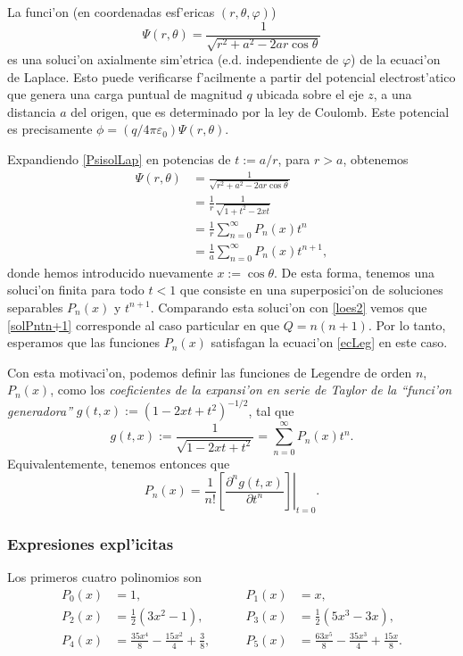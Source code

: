 La funci'on (en coordenadas esf'ericas $(r,\theta,\varphi)$)
\begin{equation}\label{PsisolLap}
\Psi(r,\theta)=\frac{1}{\sqrt{r^2+a^2-2ar\cos\theta}}
\end{equation}
es una soluci'on axialmente sim'etrica (e.d. independiente de $\varphi$) de la ecuaci'on de Laplace. Esto puede verificarse f'acilmente a partir del potencial electrost'atico que genera una carga puntual de magnitud $q$ ubicada sobre el eje $z$, a una distancia $a$ del origen, que es determinado por la ley de Coulomb. Este potencial es precisamente $\phi=(q/4\pi\varepsilon_0)\Psi(r,\theta)$.

Expandiendo \eqref{PsisolLap} en potencias de $t:=a/r$, para $r>a$, obtenemos
\begin{align}
\Psi(r,\theta) &= \frac{1}{\sqrt{r^2+a^2-2ar\cos\theta}} \\
&= \frac{1}{r}\frac{1}{\sqrt{1+t^2-2xt}} \\
&= \frac{1}{r}\sum_{n=0}^\infty P_n(x)t^n \\
&= \frac{1}{a}\sum_{n=0}^\infty P_n(x)t^{n+1}, \label{solPntn+1}
\end{align}
donde hemos introducido nuevamente $x:=\cos\theta$. De esta forma, tenemos una soluci'on finita para todo $t<1$ que consiste en una superposici'on de soluciones separables $P_n(x)$ y $t^{n+1}$. Comparando esta soluci'on con \eqref{loes2} vemos que \eqref{solPntn+1} corresponde al caso particular en que $Q=n(n+1)$. Por lo tanto, esperamos que las funciones $P_n(x)$ satisfagan la ecuaci'on \eqref{ecLeg} en este caso.  

Con esta motivaci'on, podemos definir las funciones de Legendre de orden $n$, $P_n(x)$, como los \textit{coeficientes de la expansi'on en serie de Taylor de la ``funci'on generadora''}  $g(t,x):=(1-2xt+t^2)^{-1/2}$, tal que
\begin{equation}
g(t,x):=\frac{1}{\sqrt{1-2xt+t^2}}=\sum_{n=0}^{\infty}P_{n}(x)t^{n}.
\end{equation}
Equivalentemente, tenemos entonces que
\begin{equation}
P_n(x)=\frac{1}{n!}\left.\left[\frac{\partial^ng(t,x)}{\partial t^n}\right]\right|_{t=0}.
\end{equation}

\subsubsection{Expresiones expl'icitas}
Los primeros cuatro polinomios son
 \begin{align*}
  P_0(x) &= 1, &P_1(x) &= x,\\
  P_2(x) &= \frac 12(3x^2-1), &P_3(x) &= \frac 12(5x^3-3x),\\
  P_4(x) &= \frac{35 x^{4}}{8} - \frac{15 x^{2}}{4} + \frac{3}{8}, \qquad 
  &P_5(x) &= \frac{63 x^{5}}{8} - \frac{35 x^{3}}{4} + \frac{15 x}{8}.
 \end{align*}
 
